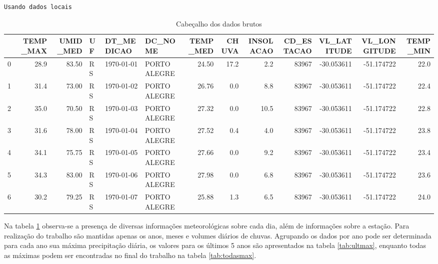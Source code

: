     \begin{Verbatim}[commandchars=\\\{\}]
Usando dados locais
    \end{Verbatim}

    
    \begin{table}[H]
    \centering
    \caption{Cabeçalho dos dados brutos}
    \begin{adjustbox}{width=\columnwidth,center}
    {\begin{tabular}{lrrlllrrrrrrr}
\toprule
{} &  TEMP\_MAX &  UMID\_MED &  UF &  DT\_MEDICAO &       DC\_NOME &  TEMP\_MED &  CHUVA &  INSOLACAO &  CD\_ESTACAO &  VL\_LATITUDE &  VL\_LONGITUDE &  TEMP\_MIN \\
\midrule
0 &      28.9 &     83.50 &  RS &  1970-01-01 &  PORTO ALEGRE &     24.50 &   17.2 &        2.2 &       83967 &   -30.053611 &    -51.174722 &      22.0 \\
1 &      31.4 &     73.00 &  RS &  1970-01-02 &  PORTO ALEGRE &     26.76 &    0.0 &        8.8 &       83967 &   -30.053611 &    -51.174722 &      22.4 \\
2 &      35.0 &     70.50 &  RS &  1970-01-03 &  PORTO ALEGRE &     27.32 &    0.0 &       10.5 &       83967 &   -30.053611 &    -51.174722 &      22.8 \\
3 &      31.6 &     78.00 &  RS &  1970-01-04 &  PORTO ALEGRE &     27.52 &    0.4 &        4.0 &       83967 &   -30.053611 &    -51.174722 &      23.8 \\
4 &      34.1 &     75.75 &  RS &  1970-01-05 &  PORTO ALEGRE &     27.66 &    0.0 &        9.2 &       83967 &   -30.053611 &    -51.174722 &      23.4 \\
5 &      34.3 &     83.00 &  RS &  1970-01-06 &  PORTO ALEGRE &     27.98 &    0.0 &        6.8 &       83967 &   -30.053611 &    -51.174722 &      23.6 \\
6 &      30.2 &     79.25 &  RS &  1970-01-07 &  PORTO ALEGRE &     25.88 &    1.3 &        6.5 &       83967 &   -30.053611 &    -51.174722 &      24.0 \\
\bottomrule
\end{tabular}
}
	\end{adjustbox}
    \label{tab:cabdados}
    \end{table}
    

    
    Na tabela \ref{tab:cabdados} observa-se a presença de diversas
informações meteorológicas sobre cada dia, além de informações sobre a
estação. Para realização do trabalho são mantidas apenas os anos, meses
e volumes diários de chuvas. Agrupando os dados por ano pode ser
determinada para cada ano sua máxima precipitação diária, os valores
para os últimos 5 anos são apresentados na tabela \ref{tab:ultmax},
enquanto todas as máximas podem ser encontradas no final do trabalho na
tabela \ref{tab:todasmax}.

